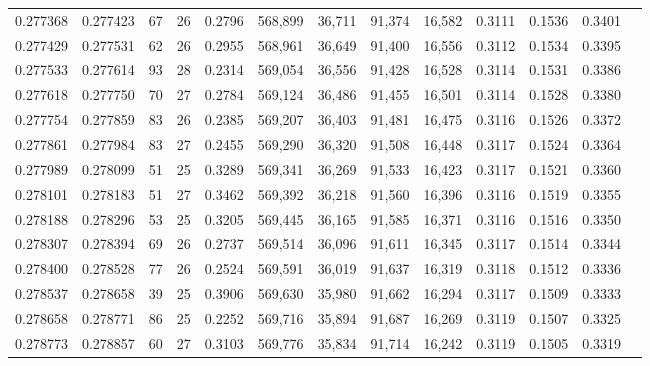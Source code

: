 \begin{tabular}{rrrrrrrrrrrrr}
0.277368 & 0.277423 &  67 &  26 &                                     0.2796 & 568,899 &  36,711 &  91,374 &  16,582 & 0.3111 & 0.1536 & 0.3401 \\
0.277429 & 0.277531 &  62 &  26 &                                     0.2955 & 568,961 &  36,649 &  91,400 &  16,556 & 0.3112 & 0.1534 & 0.3395 \\
0.277533 & 0.277614 &  93 &  28 &                                     0.2314 & 569,054 &  36,556 &  91,428 &  16,528 & 0.3114 & 0.1531 & 0.3386 \\
0.277618 & 0.277750 &  70 &  27 &                                     0.2784 & 569,124 &  36,486 &  91,455 &  16,501 & 0.3114 & 0.1528 & 0.3380 \\
0.277754 & 0.277859 &  83 &  26 &                                     0.2385 & 569,207 &  36,403 &  91,481 &  16,475 & 0.3116 & 0.1526 & 0.3372 \\
0.277861 & 0.277984 &  83 &  27 &                                     0.2455 & 569,290 &  36,320 &  91,508 &  16,448 & 0.3117 & 0.1524 & 0.3364 \\
0.277989 & 0.278099 &  51 &  25 &                                     0.3289 & 569,341 &  36,269 &  91,533 &  16,423 & 0.3117 & 0.1521 & 0.3360 \\
0.278101 & 0.278183 &  51 &  27 &                                     0.3462 & 569,392 &  36,218 &  91,560 &  16,396 & 0.3116 & 0.1519 & 0.3355 \\
0.278188 & 0.278296 &  53 &  25 &                                     0.3205 & 569,445 &  36,165 &  91,585 &  16,371 & 0.3116 & 0.1516 & 0.3350 \\
0.278307 & 0.278394 &  69 &  26 &                                     0.2737 & 569,514 &  36,096 &  91,611 &  16,345 & 0.3117 & 0.1514 & 0.3344 \\
0.278400 & 0.278528 &  77 &  26 &                                     0.2524 & 569,591 &  36,019 &  91,637 &  16,319 & 0.3118 & 0.1512 & 0.3336 \\
0.278537 & 0.278658 &  39 &  25 &                                     0.3906 & 569,630 &  35,980 &  91,662 &  16,294 & 0.3117 & 0.1509 & 0.3333 \\
0.278658 & 0.278771 &  86 &  25 &                                     0.2252 & 569,716 &  35,894 &  91,687 &  16,269 & 0.3119 & 0.1507 & 0.3325 \\
0.278773 & 0.278857 &  60 &  27 &                                     0.3103 & 569,776 &  35,834 &  91,714 &  16,242 & 0.3119 & 0.1505 & 0.3319 \\

\end{tabular}
